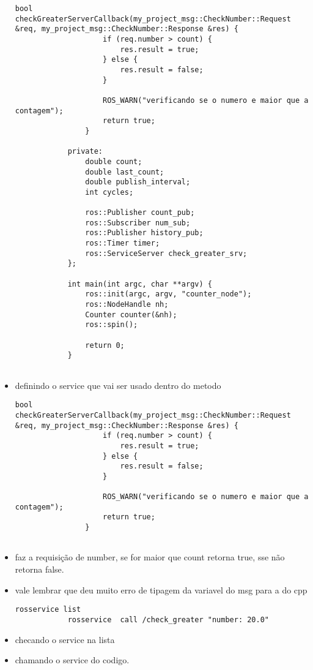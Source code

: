 \documentclass[letterpaper]{article}
\begin{document}
\begin{itemize}
\begin{lstlisting}[style=cppStyle, title=src/nome\_project/src/counter.cpp]
                bool checkGreaterServerCallback(my_project_msg::CheckNumber::Request &req, my_project_msg::CheckNumber::Response &res) {
                    if (req.number > count) {
                        res.result = true;
                    } else {
                        res.result = false;
                    }
            
                    ROS_WARN("verificando se o numero e maior que a contagem");
                    return true;
                }
            
            private:
                double count;
                double last_count;
                double publish_interval;
                int cycles;
            
                ros::Publisher count_pub;
                ros::Subscriber num_sub;
                ros::Publisher history_pub;
                ros::Timer timer;
                ros::ServiceServer check_greater_srv;
            };
            
            int main(int argc, char **argv) {
                ros::init(argc, argv, "counter_node");
                ros::NodeHandle nh;
                Counter counter(&nh);
                ros::spin();
            
                return 0;
            }
            
        \end{lstlisting}
        \item definindo o service que vai ser usado dentro do metodo
        \begin{lstlisting}[style=cppstyle, title=função de service no cpp] 
            bool checkGreaterServerCallback(my_project_msg::CheckNumber::Request &req, my_project_msg::CheckNumber::Response &res) {
                    if (req.number > count) {
                        res.result = true;
                    } else {
                        res.result = false;
                    }
            
                    ROS_WARN("verificando se o numero e maior que a contagem");
                    return true;
                }
            
        \end{lstlisting}
        \item faz a requisição de number, se for maior que count retorna true, sse não retorna false.
        \item vale lembrar que deu muito erro de tipagem da variavel do msg para a do cpp
        \begin{lstlisting}[style=mystyle, title=terminal] 
            rosservice list
            rosservice  call /check_greater "number: 20.0" 
        \end{lstlisting}
        \item checando o service na lista 
        \item chamando o service do codigo.
    \end{itemize}
\end{document}
